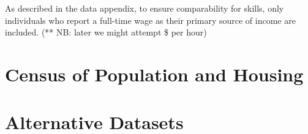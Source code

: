 As described in the data appendix, to ensure comparability for skills, only individuals who report a full-time wage as their primary source of income are included. (** NB: later we might attempt \$ per hour)



\section{Census of Population and Housing}


\section{Alternative Datasets}



